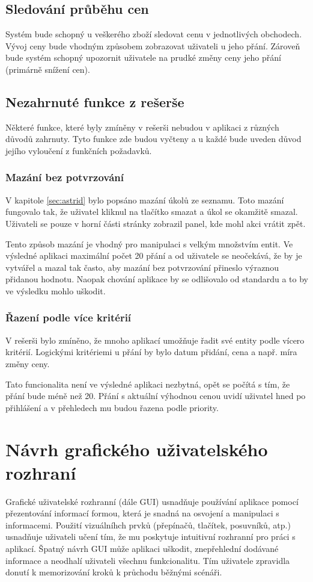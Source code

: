 \subsection{Sledování průběhu cen}
Systém bude schopný u veškerého zboží sledovat cenu v jednotlivých obchodech. Vývoj ceny bude vhodným způsobem zobrazovat uživateli u jeho přání. Zároveň bude systém schopný upozornit uživatele na prudké změny ceny jeho přání (primárně snížení cen).

\subsection{Nezahrnuté funkce z rešerše}
Některé funkce, které byly zmíněny v rešerši nebudou v aplikaci z různých důvodů zahrnuty. Tyto funkce zde budou vyčteny a u každé bude uveden důvod jejího vyloučení z funkčních požadavků.

\subsubsection{Mazání bez potvrzování}
V kapitole \ref{sec:astrid} bylo popsáno mazání úkolů ze seznamu. Toto mazání fungovalo tak, že uživatel kliknul na tlačítko smazat a úkol se okamžitě smazal. Uživateli se pouze v horní části stránky zobrazil panel, kde mohl akci vrátit zpět.

Tento způsob mazání je vhodný pro manipulaci s velkým množstvím entit. Ve výsledné aplikaci maximální počet 20 přání a od uživatele se neočekává, že by je vytvářel a mazal tak často, aby mazání bez potvrzování přineslo výraznou přidanou hodnotu. Naopak chování aplikace by se odlišovalo od standardu a to by ve výsledku mohlo uškodit.

\subsubsection{Řazení podle více kritérií}
V rešerši bylo zmíněno, že mnoho aplikací umožňuje řadit své entity podle vícero kritérií. Logickými kritériemi u přání by bylo datum přidání, cena a např. míra změny ceny.

Tato funcionalita není ve výsledné aplikaci nezbytná, opět se počítá s tím, že přání bude méně než 20. Přání s aktuální výhodnou cenou uvidí uživatel hned po přihlášení a v přehledech mu budou řazena podle priority.

\section{Návrh grafického uživatelského rozhraní}
Grafické uživatelské rozhranní (dále GUI) usnadňuje používání aplikace pomocí přezentování informací formou, která je snadná na osvojení a manipulaci s informacemi. Použití vizuálníhch prvků (přepínačů, tlačítek, posuvníků, atp.) usnadňuje uživateli učení tím, že mu poskytuje intuitivní rozhranní pro práci s aplikací. Špatný návrh GUI může aplikaci uškodit, znepřehlední dodávané informace a neodhalí uživateli všechnu funkcionalitu. Tím uživatele zpravidla donutí k memorizování kroků k průchodu běžnými scénáři\cite{toby2001expgui}.

